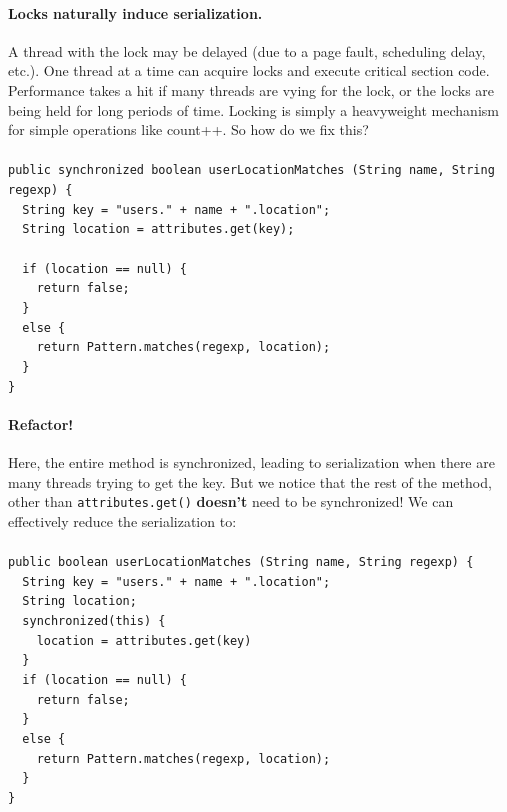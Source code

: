 \documentclass{article}
\begin{document}
\paragraph {Locks naturally induce serialization.} A thread with the lock may be delayed (due to a page fault, scheduling delay, etc.). One thread at a time can acquire locks and execute critical section code. Performance takes a hit if many threads are vying for the lock, or the locks are being held for long periods of time. Locking is simply a heavyweight mechanism for simple operations like count++. So how do we fix this?\\\\
\lstinline|public synchronized boolean userLocationMatches (String name, String regexp) {|\\
\lstinline|  String key = "users." + name + ".location";|\\
\lstinline|  String location = attributes.get(key);|\\\\
\lstinline|  if (location == null) {|\\
\lstinline|    return false;|\\
\lstinline|  }|\\
\lstinline|  else {|\\
\lstinline|    return Pattern.matches(regexp, location);|\\
\lstinline|  }|\\
\lstinline|}|\\
\paragraph{Refactor!} Here, the entire method is synchronized, leading to serialization when there are many threads trying to get the key. But we notice that the rest of the method, other than \lstinline{attributes.get()} \textbf{doesn't} need to be synchronized! We can effectively reduce the serialization to:\\\\
\lstinline|public boolean userLocationMatches (String name, String regexp) {|\\
\lstinline|  String key = "users." + name + ".location";|\\
\lstinline|  String location;|\\
\lstinline|  synchronized(this) {|\\
\lstinline|    location = attributes.get(key)|\\
\lstinline|  }|\\
\lstinline|  if (location == null) {|\\
\lstinline|    return false;|\\
\lstinline|  }|\\
\lstinline|  else {|\\
\lstinline|    return Pattern.matches(regexp, location);|\\
\lstinline|  }|\\
\lstinline|}|\\
\end{document}

